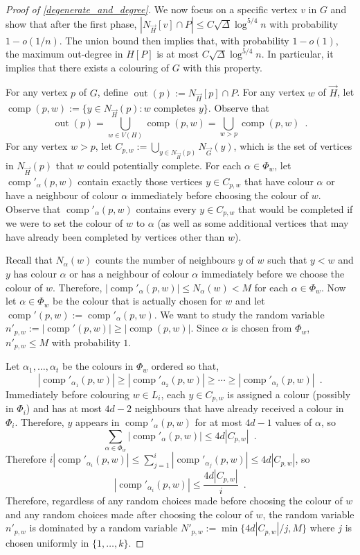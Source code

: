 \documentclass{patmorin}
\DeclareMathOperator{\outn}{out}
\DeclareMathOperator{\comp}{comp}
\begin{document}
\begin{proof}[Proof of \cref{degenerate_and_degree}]
  We now focus on a specific vertex $v$ in $G$ and show that after the first phase, $|N_{\overrightarrow{H}}[v]\cap P|\le C\sqrt{\Delta}\log^{5/4} n$ with probability $1-o(1/n)$.  The union bound then implies that, with probability $1-o(1)$, the maximum out-degree in $H[P]$ is at most $C\sqrt{\Delta}\log^{5/4} n$.  In particular, it implies that there exists a colouring of $G$ with this property.

  For any vertex $p$ of $G$, define $\outn(p):=N_{\overrightarrow{H}}[p]\cap P$. For any vertex $w$ of $\overrightarrow{H}$, let $\comp(p,w):=\{y\in N_{\overrightarrow{H}}(p):\text{$w$ completes $y$}\}$.  Observe that
  \[
    \outn(p) = \bigcup_{w\in V(H)} \comp(p,w) = \bigcup_{w>p} \comp(p,w) \enspace .
  \]
  For any vertex $w>p$, let $C_{p,w}:=\bigcup_{y\in N_{\overrightarrow{H}}(p)} N_{\overrightarrow{G}}(y)$, which is the set of vertices in $N_{\overrightarrow{H}}(p)$ that $w$ could potentially complete.  For each $\alpha\in\Phi_w$, let $\comp'_\alpha(p,w)$ contain exactly those vertices $y\in C_{p,w}$ that have colour $\alpha$ or have a neighbour of colour $\alpha$ immediately before choosing the colour of $w$.  Observe that $\comp'_\alpha(p,w)$ contains every $y\in C_{p,w}$ that would be completed if we were to set the colour of $w$ to $\alpha$ (as well as some additional vertices that may have already been completed by vertices other than $w$).

  Recall that $N_\alpha(w)$ counts the number of neighbours $y$ of $w$ such that $y < w$ and $y$ has colour $\alpha$ or has a neighbour of colour $\alpha$ immediately before we choose the colour of $w$.  Therefore,  $|\comp'_\alpha(p,w)|\le N_\alpha(w)< M$ for each $\alpha\in\Phi_w$.  Now let $\alpha\in\Phi_w$ be the colour that is actually chosen for $w$ and let $\comp'(p,w):=\comp'_\alpha(p,w)$.  We want to study the random variable $n'_{p,w}:=|\comp'(p,w)|\ge |\comp(p,w)|$.  Since $\alpha$ is chosen from $\Phi_w$, $n'_{p,w}\le M$ with probability $1$.

  Let $\alpha_1,\ldots,\alpha_t$ be the colours in $\Phi_w$ ordered so that,
  \[
    |\comp'_{\alpha_1}(p,w)|\ge|\comp'_{\alpha_2}(p,w)|\ge\cdots\ge |\comp'_{\alpha_t}(p,w)| \enspace .
  \]
  Immediately before colouring $w\in L_i$, each $y\in C_{p,w}$ is assigned a colour (possibly in $\Phi_i$) and has at most $4d-2$ neighbours that have already received a colour in $\Phi_i$.  Therefore, $y$ appears in
  $\comp'_{\alpha}(p,w)$ for at most $4d-1$ values of $\alpha$, so
  \[
    \sum_{\alpha\in\Phi_w} |\comp'_{\alpha}(p,w)| \le 4d| C_{p,w}| \enspace .
  \]
  Therefore $i|\comp'_{\alpha_i}(p,w)|\le\sum_{j=1}^i|\comp'_{\alpha_j}(p,w)|\le 4d|C_{p,w}|$, so
  \[
    |\comp'_{\alpha_i}(p,w)|\le \frac{4d|C_{p,w}|}{i} \enspace .
  \]
  Therefore, regardless of any random choices made before choosing the colour of $w$ and any random choices made after choosing the colour of $w$, the random variable $n'_{p,w}$ is dominated by a random variable $N'_{p,w}:=\min\{4d|C_{p,w}|/j,M\}$ where $j$ is chosen uniformly in $\{1,\ldots,k\}$.


\end{proof}
\end{document}
